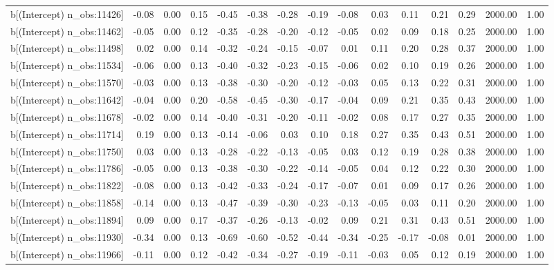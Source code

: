 \begin{table}[ht]
\begin{tabular}{rrrrrrrrrrrrrrr}
  b[(Intercept) n\_obs:11426] & -0.08 & 0.00 & 0.15 & -0.45 & -0.38 & -0.28 & -0.19 & -0.08 & 0.03 & 0.11 & 0.21 & 0.29 & 2000.00 & 1.00 \\ 
  b[(Intercept) n\_obs:11462] & -0.05 & 0.00 & 0.12 & -0.35 & -0.28 & -0.20 & -0.12 & -0.05 & 0.02 & 0.09 & 0.18 & 0.25 & 2000.00 & 1.00 \\ 
  b[(Intercept) n\_obs:11498] & 0.02 & 0.00 & 0.14 & -0.32 & -0.24 & -0.15 & -0.07 & 0.01 & 0.11 & 0.20 & 0.28 & 0.37 & 2000.00 & 1.00 \\ 
  b[(Intercept) n\_obs:11534] & -0.06 & 0.00 & 0.13 & -0.40 & -0.32 & -0.23 & -0.15 & -0.06 & 0.02 & 0.10 & 0.19 & 0.26 & 2000.00 & 1.00 \\ 
  b[(Intercept) n\_obs:11570] & -0.03 & 0.00 & 0.13 & -0.38 & -0.30 & -0.20 & -0.12 & -0.03 & 0.05 & 0.13 & 0.22 & 0.31 & 2000.00 & 1.00 \\ 
  b[(Intercept) n\_obs:11642] & -0.04 & 0.00 & 0.20 & -0.58 & -0.45 & -0.30 & -0.17 & -0.04 & 0.09 & 0.21 & 0.35 & 0.43 & 2000.00 & 1.00 \\ 
  b[(Intercept) n\_obs:11678] & -0.02 & 0.00 & 0.14 & -0.40 & -0.31 & -0.20 & -0.11 & -0.02 & 0.08 & 0.17 & 0.27 & 0.35 & 2000.00 & 1.00 \\ 
  b[(Intercept) n\_obs:11714] & 0.19 & 0.00 & 0.13 & -0.14 & -0.06 & 0.03 & 0.10 & 0.18 & 0.27 & 0.35 & 0.43 & 0.51 & 2000.00 & 1.00 \\ 
  b[(Intercept) n\_obs:11750] & 0.03 & 0.00 & 0.13 & -0.28 & -0.22 & -0.13 & -0.05 & 0.03 & 0.12 & 0.19 & 0.28 & 0.38 & 2000.00 & 1.00 \\ 
  b[(Intercept) n\_obs:11786] & -0.05 & 0.00 & 0.13 & -0.38 & -0.30 & -0.22 & -0.14 & -0.05 & 0.04 & 0.12 & 0.22 & 0.30 & 2000.00 & 1.00 \\ 
  b[(Intercept) n\_obs:11822] & -0.08 & 0.00 & 0.13 & -0.42 & -0.33 & -0.24 & -0.17 & -0.07 & 0.01 & 0.09 & 0.17 & 0.26 & 2000.00 & 1.00 \\ 
  b[(Intercept) n\_obs:11858] & -0.14 & 0.00 & 0.13 & -0.47 & -0.39 & -0.30 & -0.23 & -0.13 & -0.05 & 0.03 & 0.11 & 0.20 & 2000.00 & 1.00 \\ 
  b[(Intercept) n\_obs:11894] & 0.09 & 0.00 & 0.17 & -0.37 & -0.26 & -0.13 & -0.02 & 0.09 & 0.21 & 0.31 & 0.43 & 0.51 & 2000.00 & 1.00 \\ 
  b[(Intercept) n\_obs:11930] & -0.34 & 0.00 & 0.13 & -0.69 & -0.60 & -0.52 & -0.44 & -0.34 & -0.25 & -0.17 & -0.08 & 0.01 & 2000.00 & 1.00 \\ 
  b[(Intercept) n\_obs:11966] & -0.11 & 0.00 & 0.12 & -0.42 & -0.34 & -0.27 & -0.19 & -0.11 & -0.03 & 0.05 & 0.12 & 0.19 & 2000.00 & 1.00 \\ 

\end{tabular}
\end{table}
